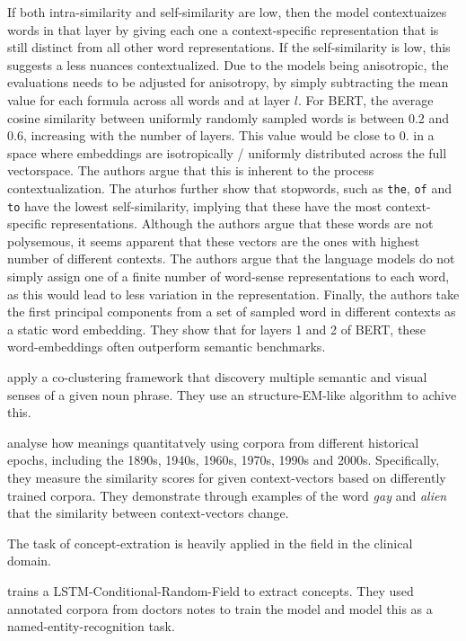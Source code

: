 \documentclass[a4paper,12pt,twoside,openright]{report}
\begin{document}
If both intra-similarity and self-similarity are low, then the model contextuaizes words in that layer by giving each one a context-specific representation that is still distinct from all other word representations.
If the self-similarity is low, this suggests a less nuances contextualized.
Due to the models being anisotropic, the evaluations needs to be adjusted for anisotropy, by simply subtracting the mean value for each formula across all words and at layer $l$. 
For BERT, the average cosine similarity between uniformly randomly sampled words is between 0.2 and 0.6, increasing with the number of layers.
This value would be close to 0. in a space where embeddings are isotropically / uniformly distributed across the full vectorspace.
The authors argue that this is inherent to the process contextualization.
The aturhos further show that stopwords, such as \texttt{the}, \texttt{of} and \texttt{to} have the lowest self-similarity, implying that these have the most context-specific representations.
Although the authors argue that these words are not polysemous, it seems apparent that these vectors are the ones with highest number of different contexts.
The authors argue that the language models do not simply assign one of a finite number of word-sense representations to each word, as this would lead to less variation in the representation.
Finally, the authors take the first principal components from a set of sampled word in different contexts as a static word embedding. 
They show that for layers 1 and 2 of BERT, these word-embeddings often outperform semantic benchmarks.

\cite{chen19} apply a co-clustering framework that discovery multiple semantic and visual senses of a given noun phrase.
They use an structure-EM-like algorithm to achive this.

\cite{hu19} analyse how meanings quantitatvely using corpora from different historical epochs, including the 1890s, 1940s, 1960s, 1970s, 1990s and 2000s. 
Specifically, they measure the similarity scores for given context-vectors based on differently trained corpora.
They demonstrate through examples of the word \textit{gay} and \textit{alien} that the similarity between context-vectors change.

The task of concept-extration is heavily applied in the field in the clinical domain.

\cite{zhu18} trains a LSTM-Conditional-Random-Field to extract concepts.
They used annotated corpora from doctors notes to train the model and model this as a named-entity-recognition task.
\end{document}
